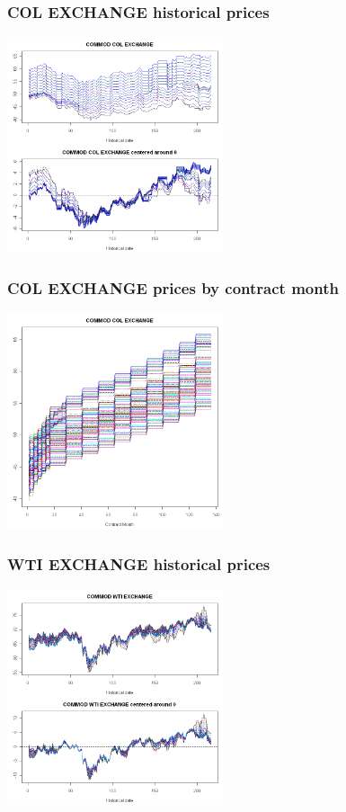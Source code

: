 \documentclass[10pt]{beamer}
\begin{document}
\frame
{
  \frametitle{COL EXCHANGE historical prices}

\begin{center}
  \includegraphics[height=2.5in]{figures/col01.png}
\end{center}
}

\frame
{
  \frametitle{COL EXCHANGE  prices by contract month}

\begin{center}
  \includegraphics[height=2.5in]{figures/col02.png}
\end{center}
}

\frame
{
  \frametitle{WTI EXCHANGE historical prices}

\begin{center}
  \includegraphics[height=2.5in]{figures/wti01.png}
\end{center}
}
\end{document}
